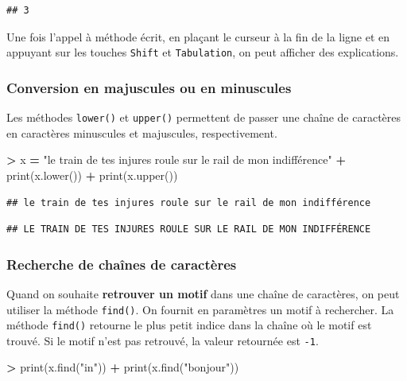 \documentclass[12pt,]{book}
\newenvironment{Shaded}{\begin{snugshade}}{\end{snugshade}}
\newcommand{\StringTok}[1]{\textcolor[rgb]{0.31,0.60,0.02}{#1}}
\newcommand{\OperatorTok}[1]{\textcolor[rgb]{0.81,0.36,0.00}{\textbf{#1}}}
\newcommand{\BuiltInTok}[1]{#1}
\newcommand{\NormalTok}[1]{#1}
\numberwithin{equation}{section}
\numberwithin{countremarque}{section}
\let\BeginKnitrBlock\begin \let\EndKnitrBlock\end
\begin{document}
\begin{lstlisting}
## 3
\end{lstlisting}

\BeginKnitrBlock{remarque}
Une fois l'appel à méthode écrit, en plaçant le curseur à la fin de la
ligne et en appuyant sur les touches \texttt{Shift} et
\texttt{Tabulation}, on peut afficher des explications.
\EndKnitrBlock{remarque}

\subsubsection{Conversion en majuscules ou en
minuscules}\label{conversion-en-majuscules-ou-en-minuscules}

Les méthodes \texttt{lower()} et \texttt{upper()} permettent de passer
une chaîne de caractères en caractères minuscules et majuscules,
respectivement.

\begin{Shaded}
\begin{Highlighting}[]
\OperatorTok{>}\NormalTok{ x }\OperatorTok{=} \StringTok{"le train de tes injures roule sur le rail de mon indifférence"}
\OperatorTok{+} \BuiltInTok{print}\NormalTok{(x.lower())}
\OperatorTok{+} \BuiltInTok{print}\NormalTok{(x.upper())}
\end{Highlighting}
\end{Shaded}

\begin{lstlisting}
## le train de tes injures roule sur le rail de mon indifférence
\end{lstlisting}

\begin{lstlisting}
## LE TRAIN DE TES INJURES ROULE SUR LE RAIL DE MON INDIFFÉRENCE
\end{lstlisting}

\subsubsection{Recherche de chaînes de
caractères}\label{recherche-de-chaines-de-caracteres}

Quand on souhaite \textbf{retrouver un motif} dans une chaîne de
caractères, on peut utiliser la méthode \texttt{find()}. On fournit en
paramètres un motif à rechercher. La méthode \texttt{find()} retourne le
plus petit indice dans la chaîne où le motif est trouvé. Si le motif
n'est pas retrouvé, la valeur retournée est \texttt{-1}.

\begin{Shaded}
\begin{Highlighting}[]
\OperatorTok{>} \BuiltInTok{print}\NormalTok{(x.find(}\StringTok{"in"}\NormalTok{))}
\OperatorTok{+} \BuiltInTok{print}\NormalTok{(x.find(}\StringTok{"bonjour"}\NormalTok{))}
\end{Highlighting}
\end{Shaded}
\end{document}

